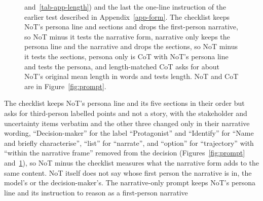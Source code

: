 \begin{figure}[tp]
{and~\ref{tab-app-length}) and the last the one-line instruction of the
earlier test described in Appendix~\ref{app-form}. The checklist keeps NoT's
persona line and sections and drops the first-person narrative, so NoT minus
it tests the narrative form, narrative only keeps the persona line and the
narrative and drops the sections, so NoT minus it tests the sections, persona
only is CoT with NoT's persona line and tests the persona, and length-matched
CoT asks for about NoT's original mean length in words and tests length. NoT
and CoT are in Figure~\ref{fig:prompt}.}
\label{fig-app-prompts}
\end{figure}
The checklist keeps NoT's persona line and its five sections in their order
but asks for third-person labelled points and not a story, with the
stakeholder and uncertainty items verbatim and the other three changed only
in their narrative wording, ``Decision-maker'' for the label ``Protagonist''
and ``Identify'' for ``Name and briefly characterise'', ``list'' for
``narrate'', and ``option'' for ``trajectory'' with ``within the narrative
frame'' removed from the decision (Figures~\ref{fig:prompt}
and~\ref{fig-app-prompts}), so NoT minus the checklist measures what the
narrative form adds to the same content. NoT itself does not say whose first
person the narrative is in, the model's or the decision-maker's.
The narrative-only prompt keeps
NoT's persona line and its instruction to reason as a first-person narrative
